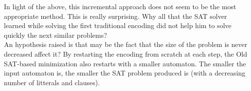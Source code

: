 \noindent In light of the above, this incremental approach does not seem to be the most appropriate method.
This is really surprising. Why all that the SAT solver learned while solving the first traditional encoding
did not help him to solve quickly the next similar problems?\\

An hypothesis raised is that may be the fact that the size of the problem is never decreased affect it? By
restarting the encoding from scratch at each step, the Old SAT-based minimization also restarts with a
smaller automaton. The smaller the input automaton is, the smaller the SAT problem produced is (with a
decreasing number of litterals and clauses).